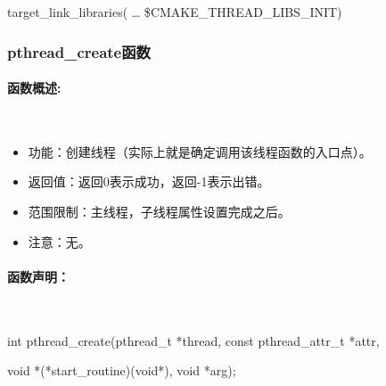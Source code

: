 \documentclass[UTF8]{article}%
\begin{document}
target\_link\_libraries( … \${CMAKE\_THREAD\_LIBS\_INIT})

\subsubsection{pthread\_create函数}

\paragraph{函数概述:}~{}

\begin{itemize}
    \item 功能：创建线程（实际上就是确定调用该线程函数的入口点）。
    \item 返回值：返回0表示成功，返回-1表示出错。
    \item 范围限制：主线程，子线程属性设置完成之后。
    \item 注意：无。
\end{itemize}

\paragraph{函数声明：}~{}

int pthread\_create(pthread\_t *thread, const pthread\_attr\_t *attr,

void *(*start\_routine)(void*), void *arg); 
\end{document}
